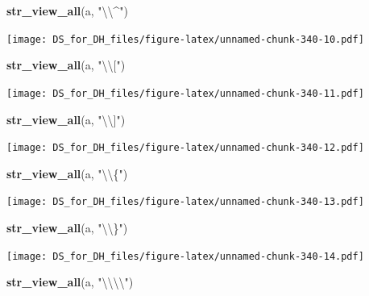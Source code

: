 \documentclass[
]{book}
\newenvironment{Shaded}{\begin{snugshade}}{\end{snugshade}}
\newcommand{\CharTok}[1]{\textcolor[rgb]{0.31,0.60,0.02}{#1}}
\newcommand{\KeywordTok}[1]{\textcolor[rgb]{0.13,0.29,0.53}{\textbf{#1}}}
\newcommand{\NormalTok}[1]{#1}
\newcommand{\StringTok}[1]{\textcolor[rgb]{0.31,0.60,0.02}{#1}}
\begin{document}
\begin{Shaded}
\begin{Highlighting}[]
\KeywordTok{str_view_all}\NormalTok{(a, }\StringTok{"}\CharTok{\textbackslash{}\textbackslash{}}\StringTok{^"}\NormalTok{)}
\end{Highlighting}
\end{Shaded}

\texttt{[image: DS\_for\_DH\_files/figure-latex/unnamed-chunk-340-10.pdf]}

\begin{Shaded}
\begin{Highlighting}[]
\KeywordTok{str_view_all}\NormalTok{(a, }\StringTok{"}\CharTok{\textbackslash{}\textbackslash{}}\StringTok{["}\NormalTok{)}
\end{Highlighting}
\end{Shaded}

\texttt{[image: DS\_for\_DH\_files/figure-latex/unnamed-chunk-340-11.pdf]}

\begin{Shaded}
\begin{Highlighting}[]
\KeywordTok{str_view_all}\NormalTok{(a, }\StringTok{"}\CharTok{\textbackslash{}\textbackslash{}}\StringTok{]"}\NormalTok{)}
\end{Highlighting}
\end{Shaded}

\texttt{[image: DS\_for\_DH\_files/figure-latex/unnamed-chunk-340-12.pdf]}

\begin{Shaded}
\begin{Highlighting}[]
\KeywordTok{str_view_all}\NormalTok{(a, }\StringTok{"}\CharTok{\textbackslash{}\textbackslash{}}\StringTok{\{"}\NormalTok{)}
\end{Highlighting}
\end{Shaded}

\texttt{[image: DS\_for\_DH\_files/figure-latex/unnamed-chunk-340-13.pdf]}

\begin{Shaded}
\begin{Highlighting}[]
\KeywordTok{str_view_all}\NormalTok{(a, }\StringTok{"}\CharTok{\textbackslash{}\textbackslash{}}\StringTok{\}"}\NormalTok{)}
\end{Highlighting}
\end{Shaded}

\texttt{[image: DS\_for\_DH\_files/figure-latex/unnamed-chunk-340-14.pdf]}

\begin{Shaded}
\begin{Highlighting}[]
\KeywordTok{str_view_all}\NormalTok{(a, }\StringTok{"}\CharTok{\textbackslash{}\textbackslash{}\textbackslash{}\textbackslash{}}\StringTok{"}\NormalTok{)}
\end{Highlighting}
\end{Shaded}
\end{document}
